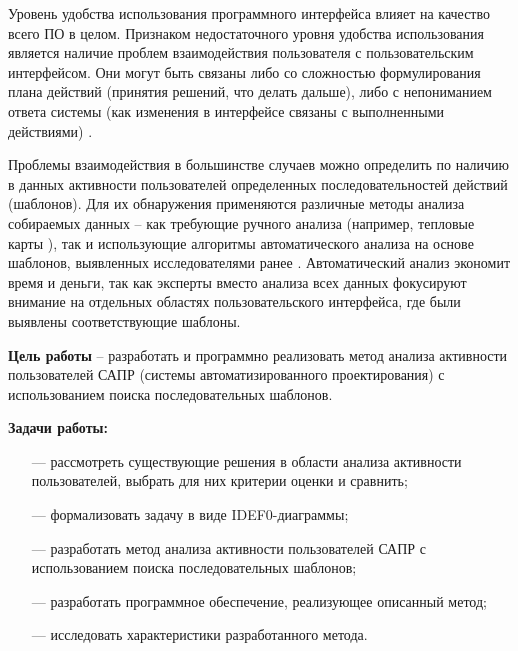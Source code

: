 
Уровень удобства использования программного интерфейса влияет на качество всего ПО в целом. Признаком недостаточного уровня удобства использования является наличие проблем взаимодействия пользователя с пользовательским интерфейсом. Они могут быть связаны либо со сложностью формулирования плана действий (принятия решений, что делать дальше), либо с непониманием ответа системы (как изменения в интерфейсе связаны с выполненными действиями) \cite{1}.

Проблемы взаимодействия в большинстве случаев можно определить по наличию в данных активности пользователей определенных последовательностей действий (шаблонов). Для их обнаружения применяются различные методы анализа собираемых данных – как требующие ручного анализа (например, тепловые карты \cite{2,3}), так и использующие алгоритмы автоматического анализа \cite{1} на основе шаблонов, выявленных исследователями ранее \cite{4, 5, 6}. Автоматический анализ экономит время и деньги, так как эксперты вместо анализа всех данных фокусируют внимание на отдельных областях пользовательского интерфейса,
где были выявлены соответствующие шаблоны.


\textbf{Цель работы} – разработать и программно реализовать метод анализа активности пользователей САПР (системы автоматизированного проектирования) с использованием поиска последовательных шаблонов.


\textbf{Задачи работы:}
\begin{itemize}
	\item[---] рассмотреть существующие решения в области анализа активности пользователей, выбрать для них критерии оценки и сравнить;
	\item[---] формализовать задачу в виде IDEF0-диаграммы;
	\item[---] разработать метод анализа активности пользователей САПР с использованием поиска последовательных шаблонов; %
	\item[---] разработать программное обеспечение, реализующее описанный метод;
	\item[---] исследовать характеристики разработанного метода.
\end{itemize}
